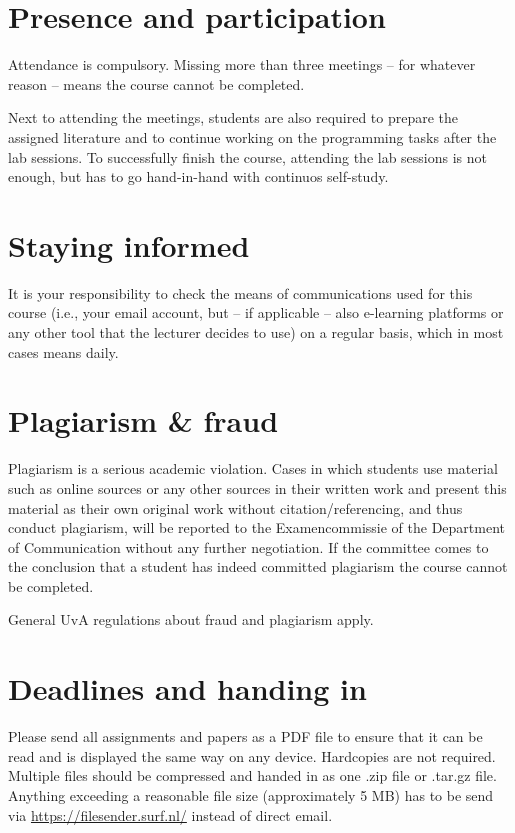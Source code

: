 \documentclass[a4paper,10pt]{report}
\begin{document}
	\section{Presence and participation}
	Attendance is compulsory. Missing more than three meetings – for whatever reason – means the course cannot be completed.
	
	Next to attending the meetings, students are also required to prepare the assigned literature and to continue working on the programming tasks after the lab sessions. To successfully finish the course, attending the lab sessions is not enough, but has to go hand-in-hand with continuos self-study.
	
	\section{Staying informed}
	It is your responsibility to check the means of communications used for this course (i.e., your email account, but – if applicable – also e-learning platforms or any other tool that the lecturer decides to use) on a regular basis, which in most cases means daily.
	
	\section{Plagiarism \& fraud}
	Plagiarism is a serious academic violation. Cases in which students use material such as online sources or any other sources in their written work and present this material as their own original work without citation/referencing, and thus conduct plagiarism, will be reported to the Examencommissie of the Department of Communication without any further negotiation. If the committee comes to the conclusion that a student has indeed committed plagiarism the course cannot be completed. 
	
	General UvA regulations about fraud and plagiarism apply.
	
	\section{Deadlines and handing in}
	Please send all assignments and papers as a PDF file to ensure that it can be read and is displayed the same way on any device. Hardcopies are not required. Multiple files should be compressed and handed in as one .zip file or .tar.gz file. Anything exceeding a reasonable file size (approximately 5 MB) has to be send via \url{https://filesender.surf.nl/} instead of direct email.
	
\end{document}
